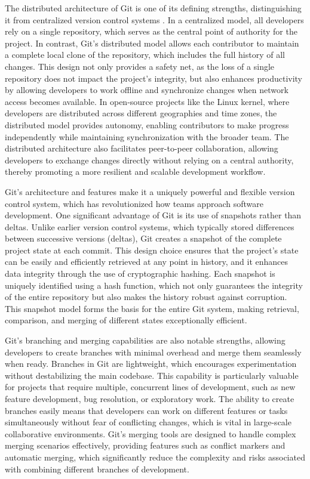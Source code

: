 The distributed architecture of Git is one of its defining strengths, distinguishing it from centralized version control systems \cite{rodriguez-bustos_how_2012}. In a centralized model, all developers rely on a single repository, which serves as the central point of authority for the project. In contrast, Git's distributed model allows each contributor to maintain a complete local clone of the repository, which includes the full history of all changes. This design not only provides a safety net, as the loss of a single repository does not impact the project's integrity, but also enhances productivity by allowing developers to work offline and synchronize changes when network access becomes available. In open-source projects like the Linux kernel, where developers are distributed across different geographies and time zones, the distributed model provides autonomy, enabling contributors to make progress independently while maintaining synchronization with the broader team. The distributed architecture also facilitates peer-to-peer collaboration, allowing developers to exchange changes directly without relying on a central authority, thereby promoting a more resilient and scalable development workflow.

Git's architecture and features make it a uniquely powerful and flexible version control system, which has revolutionized how teams approach software development. One significant advantage of Git is its use of snapshots rather than deltas. Unlike earlier version control systems, which typically stored differences between successive versions (deltas), Git creates a snapshot of the complete project state at each commit. This design choice ensures that the project's state can be easily and efficiently retrieved at any point in history, and it enhances data integrity through the use of cryptographic hashing. Each snapshot is uniquely identified using a hash function, which not only guarantees the integrity of the entire repository but also makes the history robust against corruption. This snapshot model forms the basis for the entire Git system, making retrieval, comparison, and merging of different states exceptionally efficient.

Git's branching and merging capabilities are also notable strengths, allowing developers to create branches with minimal overhead and merge them seamlessly when ready. Branches in Git are lightweight, which encourages experimentation without destabilizing the main codebase. This capability is particularly valuable for projects that require multiple, concurrent lines of development, such as new feature development, bug resolution, or exploratory work. The ability to create branches easily means that developers can work on different features or tasks simultaneously without fear of conflicting changes, which is vital in large-scale collaborative environments. Git's merging tools are designed to handle complex merging scenarios effectively, providing features such as conflict markers and automatic merging, which significantly reduce the complexity and risks associated with combining different branches of development.


